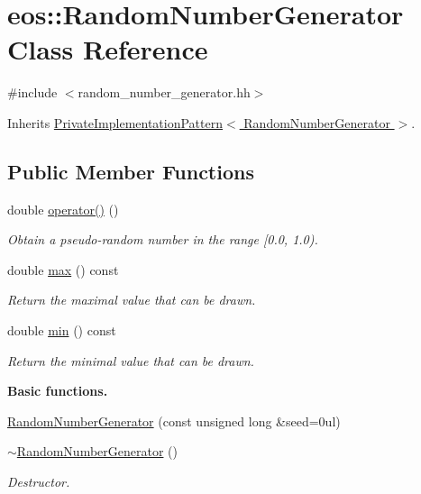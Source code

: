 \hypertarget{classeos_1_1RandomNumberGenerator}{
\section{eos::RandomNumberGenerator Class Reference}
\label{classeos_1_1RandomNumberGenerator}
}


{\ttfamily \#include $<$random\_\-number\_\-generator.hh$>$}

Inherits \hyperlink{classeos_1_1PrivateImplementationPattern}{PrivateImplementationPattern$<$ RandomNumberGenerator $>$}.\subsection*{Public Member Functions}
\begin{DoxyCompactItemize}
\item 
double \hyperlink{classeos_1_1RandomNumberGenerator_ac81a62bb3e4534fcfb0d15195ee653b0}{operator()} ()
\begin{DoxyCompactList}\small\item\em Obtain a pseudo-\/random number in the range \mbox{[}0.0, 1.0). \item\end{DoxyCompactList}\item 
double \hyperlink{classeos_1_1RandomNumberGenerator_adac254d76323261e06d42b2f48e05c50}{max} () const 
\begin{DoxyCompactList}\small\item\em Return the maximal value that can be drawn. \item\end{DoxyCompactList}\item 
double \hyperlink{classeos_1_1RandomNumberGenerator_a2268a048896484b9d12d86fcfd7a6dbb}{min} () const 
\begin{DoxyCompactList}\small\item\em Return the minimal value that can be drawn. \item\end{DoxyCompactList}\end{DoxyCompactItemize}
\begin{Indent}{\bf Basic functions.}\par
{\em \label{_amgrp451e2a62d2bd56f05565a8ac4834a177}
 }\begin{DoxyCompactItemize}
\item 
\hyperlink{classeos_1_1RandomNumberGenerator_a661f2b9c129ddd7a1c23f463ef4ec5b7}{RandomNumberGenerator} (const unsigned long \&seed=0ul)
\item 
\hyperlink{classeos_1_1RandomNumberGenerator_a379d4e110cdf0ded2e930e2e7ffa59a1}{$\sim$RandomNumberGenerator} ()
\begin{DoxyCompactList}\small\item\em Destructor. \item\end{DoxyCompactList}\end{DoxyCompactItemize}
\end{Indent}



